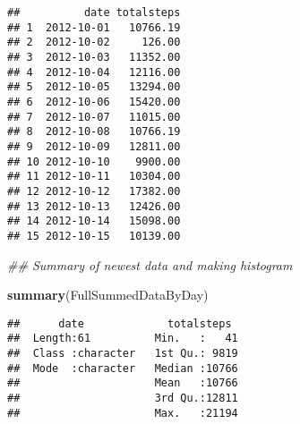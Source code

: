 \documentclass[
]{article}
\newenvironment{Shaded}{\begin{snugshade}}{\end{snugshade}}
\newcommand{\CommentTok}[1]{\textcolor[rgb]{0.56,0.35,0.01}{\textit{#1}}}
\newcommand{\KeywordTok}[1]{\textcolor[rgb]{0.13,0.29,0.53}{\textbf{#1}}}
\newcommand{\NormalTok}[1]{#1}
\begin{document}
\begin{verbatim}
##          date totalsteps
## 1  2012-10-01   10766.19
## 2  2012-10-02     126.00
## 3  2012-10-03   11352.00
## 4  2012-10-04   12116.00
## 5  2012-10-05   13294.00
## 6  2012-10-06   15420.00
## 7  2012-10-07   11015.00
## 8  2012-10-08   10766.19
## 9  2012-10-09   12811.00
## 10 2012-10-10    9900.00
## 11 2012-10-11   10304.00
## 12 2012-10-12   17382.00
## 13 2012-10-13   12426.00
## 14 2012-10-14   15098.00
## 15 2012-10-15   10139.00
\end{verbatim}

\begin{Shaded}
\begin{Highlighting}[]
\CommentTok{## Summary of newest data and making histogram}

\KeywordTok{summary}\NormalTok{(FullSummedDataByDay)}
\end{Highlighting}
\end{Shaded}

\begin{verbatim}
##      date             totalsteps   
##  Length:61          Min.   :   41  
##  Class :character   1st Qu.: 9819  
##  Mode  :character   Median :10766  
##                     Mean   :10766  
##                     3rd Qu.:12811  
##                     Max.   :21194
\end{verbatim}
\end{document}
